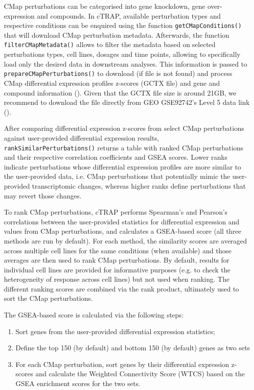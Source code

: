 CMap perturbations can be categorised into gene knockdown, gene over-expression and compounds. In cTRAP, available perturbation types and respective conditions can be enquired using the function \texttt{getCMapConditions()} that will download CMap perturbation metadata. Afterwards, the function \texttt{filterCMapMetadata()} allows to filter the metadata based on selected perturbations types, cell lines, dosages and time points, allowing to specifically load only the desired data in downstream analyses. This information is passed to \texttt{prepareCMapPerturbations()} to download (if file is not found) and process CMap differential expression profiles z-scores (GCTX file) and gene and compound information (). Given that the GCTX file size is around 21GB, we recommend to download the file directly from GEO GSE92742’s Level 5 data link ().

After comparing differential expression z-scores from select CMap perturbations against user-provided differential expression results, \texttt{rankSimilarPerturbations()} returns a table with ranked CMap perturbations and their respective correlation coefficients and GSEA scores. Lower ranks indicate perturbations whose differential expression profiles are more similar to the user-provided data, i.e. CMap perturbations that potentially mimic the user-provided transcriptomic changes, whereas higher ranks define perturbations that may revert those changes.

To rank CMap perturbations, cTRAP performs Spearman's and Pearson's correlations between the user-provided statistics for differential expression and values from CMap perturbations, and calculates a GSEA-based score (all three methods are run by default). For each method, the similarity scores are averaged across multiple cell lines for the same conditions (when available) and those averages are then used to rank CMap perturbations. By default, results for individual cell lines are provided for informative purposes (e.g. to check the heterogeneity of response across cell lines) but not used when ranking. The different ranking scores are combined via the rank product, ultimately used to sort the CMap perturbations. %

The GSEA-based score is calculated via the following steps:

\begin{enumerate}
	\item Sort genes from the user-provided differential expression statistics;
	\item Define the top 150 (by default) and bottom 150 (by default) genes as two sets
	\item For each CMap perturbation, sort genes by their differential expression z-scores and calculate the Weighted Connectivity Score (WTCS) \cite{subramanian:2017ul} based on the GSEA enrichment scores for the two sets.
\end{enumerate}

